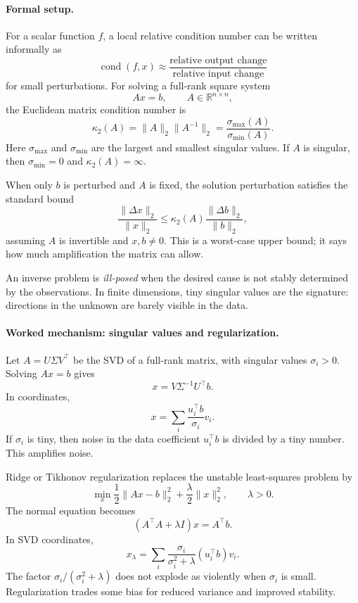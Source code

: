 \paragraph{Formal setup.}
For a scalar function \(f\), a local relative condition number can be written informally as
\[
\operatorname{cond}(f,x)
\approx
\frac{\text{relative output change}}{\text{relative input change}}
\]
for small perturbations. For solving a full-rank square system
\[
Ax=b,\qquad A\in\mathbb{R}^{n\times n},
\]
the Euclidean matrix condition number is
\[
\boxed{\kappa_2(A)=\|A\|_2\|A^{-1}\|_2
=\frac{\sigma_{\max}(A)}{\sigma_{\min}(A)}.}
\]
Here \(\sigma_{\max}\) and \(\sigma_{\min}\) are the largest and smallest singular values. If \(A\) is singular, then \(\sigma_{\min}=0\) and \(\kappa_2(A)=\infty\).

When only \(b\) is perturbed and \(A\) is fixed, the solution perturbation satisfies the standard bound
\[
\frac{\|\Delta x\|_2}{\|x\|_2}
\leq
\kappa_2(A)
\frac{\|\Delta b\|_2}{\|b\|_2},
\]
assuming \(A\) is invertible and \(x,b\neq 0\). This is a worst-case upper bound; it says how much amplification the matrix can allow.

An inverse problem is \emph{ill-posed} when the desired cause is not stably determined by the observations. In finite dimensions, tiny singular values are the signature: directions in the unknown are barely visible in the data.

\paragraph{Worked mechanism: singular values and regularization.}
Let \(A=U\Sigma V^\top\) be the SVD of a full-rank matrix, with singular values \(\sigma_i>0\). Solving \(Ax=b\) gives
\[
x=V\Sigma^{-1}U^\top b.
\]
In coordinates,
\[
x=\sum_i \frac{u_i^\top b}{\sigma_i}v_i.
\]
If \(\sigma_i\) is tiny, then noise in the data coefficient \(u_i^\top b\) is divided by a tiny number. This amplifies noise.

Ridge or Tikhonov regularization replaces the unstable least-squares problem by
\[
\min_x \frac12\|Ax-b\|_2^2+\frac{\lambda}{2}\|x\|_2^2,
\qquad \lambda>0.
\]
The normal equation becomes
\[
(A^\top A+\lambda I)x=A^\top b.
\]
In SVD coordinates,
\[
x_\lambda=\sum_i
\frac{\sigma_i}{\sigma_i^2+\lambda}(u_i^\top b)v_i.
\]
The factor \(\sigma_i/(\sigma_i^2+\lambda)\) does not explode as violently when \(\sigma_i\) is small. Regularization trades some bias for reduced variance and improved stability.

